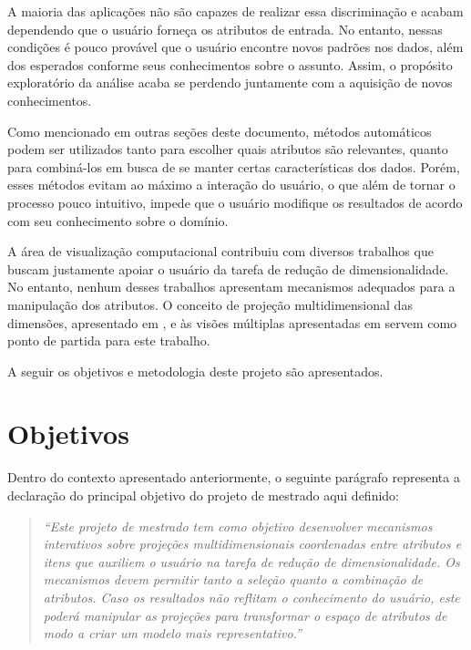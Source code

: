 A maioria das aplicações não são capazes de realizar essa discriminação e acabam dependendo que o usuário forneça os atributos de entrada. No entanto, nessas condições é pouco provável que o usuário encontre novos padrões nos dados, além dos esperados conforme seus conhecimentos sobre o assunto. Assim, o propósito exploratório da análise acaba se perdendo juntamente com a aquisição de novos conhecimentos.    

Como mencionado em outras seções deste documento, métodos automáticos podem ser utilizados tanto para escolher quais atributos são relevantes, quanto para combiná-los em busca de se manter certas características dos dados. Porém, esses métodos evitam ao máximo a interação do usuário, o que além de tornar o processo pouco intuitivo, impede que o usuário modifique os resultados de acordo com seu conhecimento sobre o domínio.


A área de visualização computacional contribuiu com diversos trabalhos que buscam justamente apoiar o usuário da tarefa de redução de dimensionalidade. No entanto, nenhum desses trabalhos apresentam mecanismos adequados para a manipulação dos atributos. O conceito de projeção multidimensional das dimensões, apresentado em \cite{Yang2007}, e às visões múltiplas apresentadas em \cite{Turkay2011} servem como ponto de partida para este trabalho.

A seguir os objetivos e metodologia deste projeto são apresentados.


\section{Objetivos}

Dentro do contexto apresentado anteriormente, o seguinte parágrafo representa a declaração do principal objetivo do projeto de mestrado aqui definido:

\begin{quote}
  \emph{``Este projeto de mestrado tem como objetivo desenvolver mecanismos interativos sobre projeções multidimensionais coordenadas entre atributos e itens que auxiliem o usuário na tarefa de redução de dimensionalidade. Os mecanismos devem permitir tanto a seleção quanto a combinação de atributos. Caso os resultados não reflitam o conhecimento do usuário, este poderá manipular as projeções para transformar o espaço de atributos de modo a criar um modelo mais representativo.''}
\end{quote}

